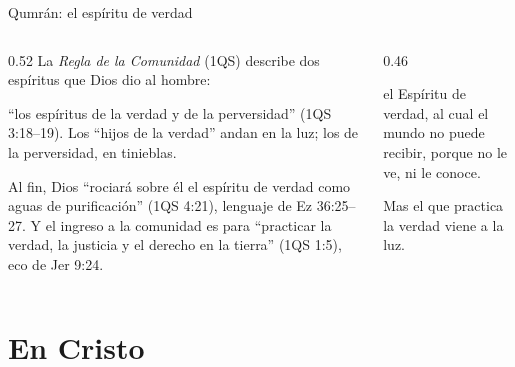 \begin{frame}{Qumrán: el espíritu de verdad}
\begin{columns}[t,onlytextwidth]
\begin{column}{0.52\textwidth}\small
La \emph{Regla de la Comunidad} (1QS) describe dos espíritus que Dios dio al hombre:
\begin{center}\end{center}
``los espíritus de la verdad y de la perversidad'' (1QS 3:18--19). Los ``hijos de la verdad'' andan en la luz; los de la perversidad, en tinieblas.\par\smallskip
\scriptsize Al fin, Dios ``rociará sobre él el espíritu de verdad como aguas de purificación'' (1QS 4:21), lenguaje de Ez 36:25--27. Y el ingreso a la comunidad es para ``practicar la verdad, la justicia y el derecho en la tierra'' (1QS 1:5), eco de Jer 9:24.
\end{column}
\begin{column}{0.46\textwidth}
\begin{cita}el Espíritu de verdad, al cual el mundo no puede recibir, porque no le ve, ni le conoce.\end{cita}
\begin{cita}Mas el que practica la verdad viene a la luz.\end{cita}
\end{column}
\end{columns}
\end{frame}

\section{En Cristo}

